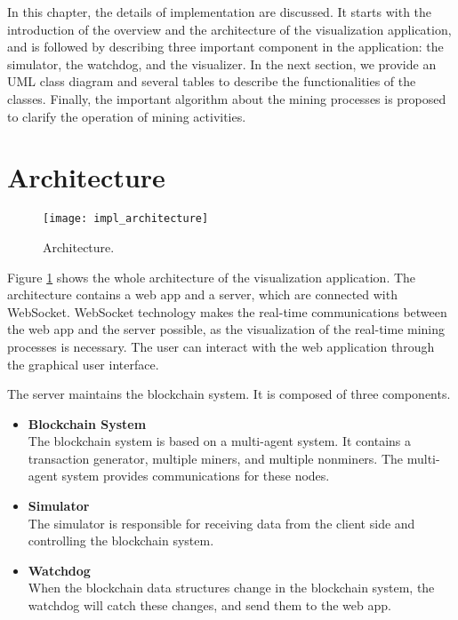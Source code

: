 In this chapter, the details of implementation are discussed. It starts with the introduction of the overview and the architecture of the visualization application, and is followed by describing three important component in the application: the simulator, the watchdog, and the visualizer. In the next section, we provide an UML class diagram and several tables to describe the functionalities of the classes. Finally, the important algorithm about the mining processes is proposed to clarify  the operation of mining activities.

\section{Architecture}

\begin{figure}[htb]
    \centering
    \texttt{[image: impl\_architecture]}
    \caption{Architecture.}
    \label{fig:architecture}
\end{figure}

Figure \ref{fig:architecture} shows the whole architecture of the visualization application. The architecture contains a web app and a server, which are connected with WebSocket. WebSocket technology makes the real-time communications between the web app and the server possible, as the visualization of the real-time mining processes is necessary. The user can interact with the web application through the graphical user interface.

The server maintains the blockchain system. It is composed of three components.

\begin{itemize}
    \item \textbf{Blockchain System} \\
        The blockchain system is based on a multi-agent system. It contains a transaction generator, multiple miners, and multiple nonminers. The multi-agent system provides communications for these nodes.
    \item \textbf{Simulator} \\
        The simulator is responsible for receiving data from the client side and controlling the blockchain system.
    \item \textbf{Watchdog} \\
        When the blockchain data structures change in the blockchain system, the watchdog will catch these changes, and send them to the web app. 
\end{itemize}

